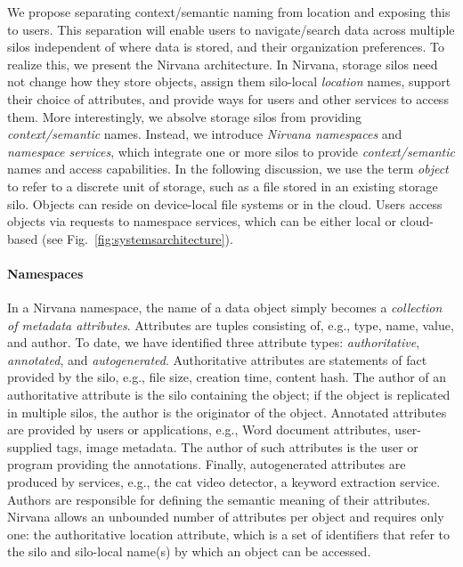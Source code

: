 
We propose separating context/semantic naming from location and exposing this to users.
This separation will enable users to navigate/search data across multiple silos independent of where data is stored, and their organization preferences.
To realize this, we present the Nirvana architecture.
In Nirvana, storage silos need not change how they store objects, assign them silo-local \textit{location} names,
support their choice of attributes, and provide ways for users and other services to access them.
More interestingly, we absolve storage silos from providing \textit{context/semantic} names.
Instead, we introduce \emph{Nirvana namespaces} and \emph{namespace services}, which integrate one or more silos to provide \textit{context/semantic} names and access capabilities. In the following discussion, we use the term \emph{object} to refer to a discrete unit of storage, such as a file stored in an existing storage silo. Objects can reside on device-local file systems or in the cloud. Users access objects via requests to namespace services, which can be either local or cloud-based (see Fig.~\ref{fig:systemsarchitecture}).

\paragraph{Namespaces} In a Nirvana namespace, the name of a data object simply becomes a \textit{collection of metadata attributes}. Attributes are tuples consisting of, e.g., type, name, value, and author.
To date, we have identified three attribute types: \emph{authoritative}, \emph{annotated}, and \emph{autogenerated}.
Authoritative attributes are statements of fact provided by the silo, e.g., file size, creation time, content hash.
The author of an authoritative attribute is the silo containing the object; if the object is replicated in multiple silos, the author is the originator of the object.
Annotated attributes are provided by users or applications, e.g., Word document attributes, user-supplied tags, image metadata.
The author of such attributes is the user or program providing the annotations.
Finally, autogenerated attributes are produced by services, e.g., the cat video detector, a keyword extraction service.
Authors are responsible for defining the semantic meaning of their attributes.
Nirvana allows an unbounded number of attributes per object and requires only one: the authoritative location attribute,
which is a set of identifiers that refer to the silo and silo-local name(s) by which an object can be accessed.


